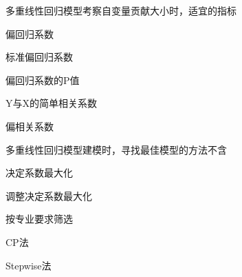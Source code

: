 \par\addvspace{6pt}\noindent\begin{minipage}{\linewidth}


多重线性回归模型考察自变量贡献大小时，适宜的指标


\begin{choices}

\item 偏回归系数

\item 标准偏回归系数

\item 偏回归系数的P值

\item Y与X的简单相关系数

\item 偏相关系数

\end{choices}

\end{minipage}\par\vspace{4pt}

\par\addvspace{6pt}\noindent\begin{minipage}{\linewidth}


多重线性回归模型建模时，寻找最佳模型的方法不含


\begin{choices}

\item 决定系数最大化

\item 调整决定系数最大化

\item 按专业要求筛选

\item CP法

\item Stepwise法

\end{choices}

\end{minipage}\par\vspace{4pt}

